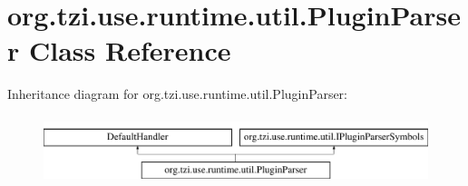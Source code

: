 \hypertarget{classorg_1_1tzi_1_1use_1_1runtime_1_1util_1_1_plugin_parser}{\section{org.\-tzi.\-use.\-runtime.\-util.\-Plugin\-Parser Class Reference}
\label{classorg_1_1tzi_1_1use_1_1runtime_1_1util_1_1_plugin_parser}
}
Inheritance diagram for org.\-tzi.\-use.\-runtime.\-util.\-Plugin\-Parser\-:\begin{figure}[H]
\begin{center}
\leavevmode
\includegraphics[height=2.000000cm]{classorg_1_1tzi_1_1use_1_1runtime_1_1util_1_1_plugin_parser}
\end{center}
\end{figure}
